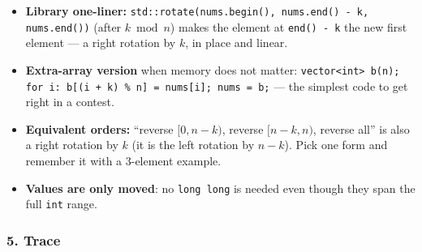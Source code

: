 \begin{tricksbox}
\begin{itemize}[leftmargin=*]
    \item \textbf{Library one-liner:} \texttt{std::rotate(nums.begin(), nums.end() - k, nums.end())} (after $k \bmod n$) makes the element at \texttt{end() - k} the new first element --- a right rotation by $k$, in place and linear.
    \item \textbf{Extra-array version} when memory does not matter: \texttt{vector<int> b(n); for i: b[(i + k) \% n] = nums[i]; nums = b;} --- the simplest code to get right in a contest.
    \item \textbf{Equivalent orders:} ``reverse $[0, n-k)$, reverse $[n-k, n)$, reverse all'' is also a right rotation by $k$ (it is the left rotation by $n-k$). Pick one form and remember it with a 3-element example.
    \item \textbf{Values are only moved}: no \texttt{long long} is needed even though they span the full \texttt{int} range.
\end{itemize}
\end{tricksbox}

\subsubsection*{5. Trace}

